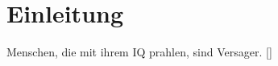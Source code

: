 \section{Einleitung}

Menschen, die mit ihrem IQ prahlen, sind Versager. [\cite[S. 99]{hawking_1999}]

